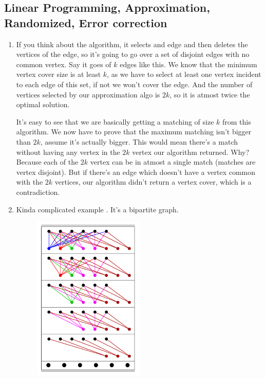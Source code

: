 \documentclass[12pt]{report}
\begin{document}
\subsection*{\bfseries Linear Programming, Approximation, Randomized, Error correction}
\begin{enumerate}[label=\textbf{\arabic*.}]

    \item If you think about the algorithm, it selects and edge and then deletes the vertices of the edge, so it's going to go over a
    set of disjoint edges with no common vertex. Say it goes of $k$ edges like this. We know that the minimum vertex cover size is at
    least $k$, as we have to select at least one vertex incident to each edge of this set, if not we won't cover the edge. And the
    number of vertices selected by our approximation algo is $2k$, so it is atmost twice the optimal solution.

    It's easy to see that we are basically getting a matching of size $k$ from this algorithm. We now have to prove that the maximum
    matching isn't bigger than $2k$, assume it's actually bigger. This would mean there's a match without having any vertex in the $2k$
    vertex our algorithm returned. Why? Because each of the $2k$ vertex can be in atmost a single match (matches are vertex disjoint).
    But if there's an edge which doesn't have a vertex common with the $2k$ vertices, our algorithm didn't return a vertex cover, which 
    is a contradiction.

    \item Kinda complicated example . It's a bipartite graph.
    
    \begin{figure}[H]
        \centering
        \includegraphics[width=0.5\textwidth]{GreedyVertexCover.png}  
    \end{figure}


\end{enumerate}
\end{document}

